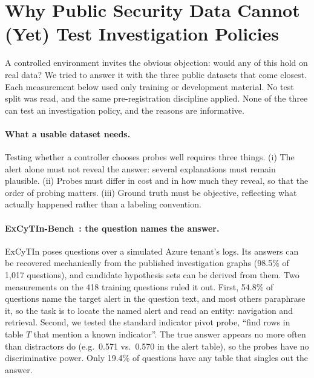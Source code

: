 \section{Why Public Security Data Cannot (Yet) Test Investigation Policies}
\label{sec:realdata}

A controlled environment invites the obvious objection: would any of this hold on real data? We tried to answer it with the three public datasets that come closest. Each measurement below used only training or development material. No test split was read, and the same pre-registration discipline applied. None of the three can test an investigation policy, and the reasons are informative.

\paragraph{What a usable dataset needs.} Testing whether a controller chooses probes well requires three things. (i) The alert alone must not reveal the answer: several explanations must remain plausible. (ii) Probes must differ in cost and in how much they reveal, so that the order of probing matters. (iii) Ground truth must be objective, reflecting what actually happened rather than a labeling convention.

\paragraph{ExCyTIn-Bench~\citep{excytin}: the question names the answer.} ExCyTIn poses questions over a simulated Azure tenant's logs. Its answers can be recovered mechanically from the published investigation graphs (98.5\% of 1{,}017 questions), and candidate hypothesis sets can be derived from them. Two measurements on the 418 training questions ruled it out. First, 54.8\% of questions name the target alert in the question text, and most others paraphrase it, so the task is to locate the named alert and read an entity: navigation and retrieval. Second, we tested the standard indicator pivot probe, ``find rows in table $T$ that mention a known indicator''. The true answer appears no more often than distractors do (e.g.\ 0.571 vs.\ 0.570 in the alert table), so the probes have no discriminative power. Only 19.4\% of questions have any table that singles out the answer.

